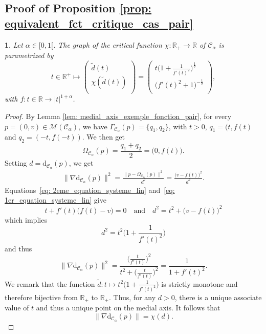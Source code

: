\documentclass[11pt,reqno,a4paper]{article}%
\newtheorem{lemma}[theorem]{\sc{Lemma}}
\theoremstyle{definition}
\theoremstyle{remark}
\newtheorem{remark}{Remark}[section]
\renewcommand{\d}{\mathrm{d}}
\newcommand{\R}{\mathbb{R}}
\newcommand{\C}{\mathbb{C}}
\renewcommand{\C}{\mathcal{C}}
\renewcommand{\d}{\mathrm{d}}
\begin{document}



\subsection{Proof of Proposition \ref{prop: equivalent_fct_critique_cas_pair}}

\begin{lemma} \label{lem: fonction_pair_C1alpha}
Let $\alpha\in [0,1[$. The graph of the critical function $\chi:\R_+ \to \R$ of $\C_\alpha$ is parametrized by
\[
t\in \R^+ \mapsto  
\left( \begin{array}{l}
\tilde{d}(t)\\
\chi(\tilde{d}(t))\\
\end{array} 
\right)
   = 
   \left( \begin{array}{l}
        t \bigg( 1 + \frac{1}{f'(t)^2} \bigg)^{\frac{1}{2}}\\
       \bigg( f'(t)^2 + 1 \bigg)^{-\frac{1}{2}}\\
    \end{array} 
   \right),
\]
with $f : t \in \R \to |t|^{1+\alpha}$.
\end{lemma}

\begin{proof}
By Lemma \ref{lem: medial_axis_exemple_fonction_pair}, for every $p= (0,v) \in \mathscr{M}(\C_\alpha)$, we have $\Gamma_{\C_\alpha}(p) = \{q_1,q_2\}$, with $t>0$, $q_1=(t,f(t)$ and $q_2=(-t,f(-t))$. We then get 
$$\Omega_{\C_\alpha}(p) = \frac{q_1+q_2}{2} = \big( 0 , f(t) \big).$$
Setting  $d = \d_{\C_\alpha}(p)$, we get
\begin{align*}
    \| \nabla \d_{\C_\alpha} (p) \|^2 = \frac{\|p - \Omega_{\C_\alpha}(p)\|^2}{d^2} = \frac{ \big( v - f(t) \big)^2}{d^2} .
\end{align*}
Equations~\eqref{eq: 2eme_equation_systeme_lin} and~\eqref{eq: 1er_equation_systeme_lin} give
$$t + f'(t) \big( f(t) - v \big) = 0
\quad \mbox{and}\quad d^2 = t^2 + \big( v - f(t) \big)^2$$
which implies
$$d^2 = t^2 \bigg( 1 + \frac{1}{f'(t)^2} \bigg)$$
and thus 
\[ \| \nabla \d_{\C_\alpha} (p) \|^2 = \frac{ \Big( \frac{t}{f'(t)} \Big)^2 }{t^2 + \Big( \frac{t}{f'(t)} \Big)^2} = \frac{1}{1 + f'(t)^2}. \]
We remark that the function $\tilde{d}:t \mapsto t^2 \bigg( 1 + \frac{1}{f'(t)^2} \bigg)$ is strictly monotone and therefore bijective from $\R_+$ to $\R_+$.
Thus, for any $d > 0$, there is a unique associate value of $t$ and thus a unique point on the medial axis.
It follows that $$\| \nabla \d_{\C_\alpha}(p) \| = \chi(d).$$
\end{proof}
\end{document}
